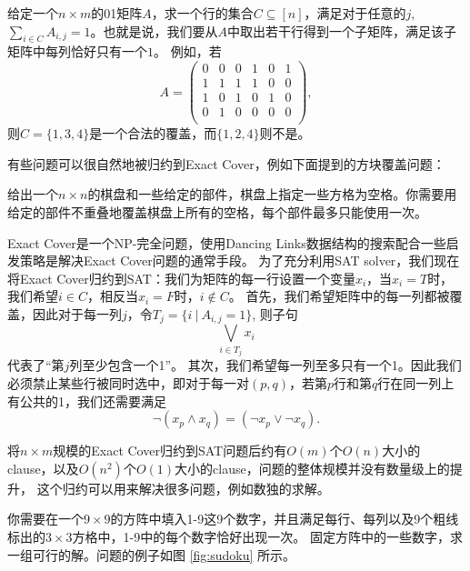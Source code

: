 \begin{prob}
 给定一个$n\times m$的01矩阵$A$，求一个行的集合$C\subseteq[n]$，满足对于任意的$j$, 
 $\sum_{i\in C} A_{i,j} = 1$。也就是说，我们要从$A$中取出若干行得到一个子矩阵，满足该子矩阵中每列恰好只有一个$1$。
 例如，若
 $$A = 
 \begin{pmatrix}
  0 & 0 & 0 & 1 & 0 & 1\\
  1 & 1 & 1 & 1 & 0 & 0\\
  1 & 0 & 1 & 0 & 1 & 0\\
  0 & 1 & 0 & 0 & 0 & 0\\
 \end{pmatrix},
 $$
 则$C=\{1, 3, 4\}$是一个合法的覆盖，而$\{1, 2, 4\}$则不是。
\end{prob}

有些问题可以很自然地被归约到Exact Cover，例如下面提到的方块覆盖问题：

\begin{prob}
给出一个$n\times n$的棋盘和一些给定的部件，棋盘上指定一些方格为空格。你需要用给定的部件不重叠地覆盖棋盘上所有的空格，每个部件最多只能使用一次。
\end{prob}



\begin{solution}
Exact Cover是一个NP-完全问题，使用Dancing Links数据结构的搜索配合一些启发策略是解决Exact Cover问题的通常手段。
为了充分利用SAT solver，我们现在将Exact Cover归约到SAT：我们为矩阵的每一行设置一个变量$x_i$，当$x_i=T$时，我们希望$i\in C$，相反当$x_i=F$时，$i\notin C$。
首先，我们希望矩阵中的每一列都被覆盖，因此对于每一列$j$，令$T_j = \{ i~|~ A_{i,j} = 1\}$, 则子句
$$\bigvee_{i \in T_j} x_i$$
代表了``第$j$列至少包含一个1''。
其次，我们希望每一列至多只有一个1。因此我们必须禁止某些行被同时选中，即对于每一对$(p,q)$，若第$p$行和第$q$行在同一列上有公共的1，我们还需要满足
$$\neg (x_p \land x_q) = (\neg x_p \lor \neg x_q).$$
\end{solution}

将$n\times m$规模的Exact Cover归约到SAT问题后约有$O(m)$个$O(n)$大小的clause，以及$O(n^2)$个$O(1)$大小的clause，问题的整体规模并没有数量级上的提升，
这个归约可以用来解决很多问题，例如数独的求解。

\begin{prob}
 你需要在一个$9\times9$的方阵中填入1-9这9个数字，并且满足每行、每列以及9个粗线标出的$3\times3$方格中，1-9中的每个数字恰好出现一次。
 固定方阵中的一些数字，求一组可行的解。问题的例子如图 \ref{fig:sudoku} 所示。
\end{prob}

